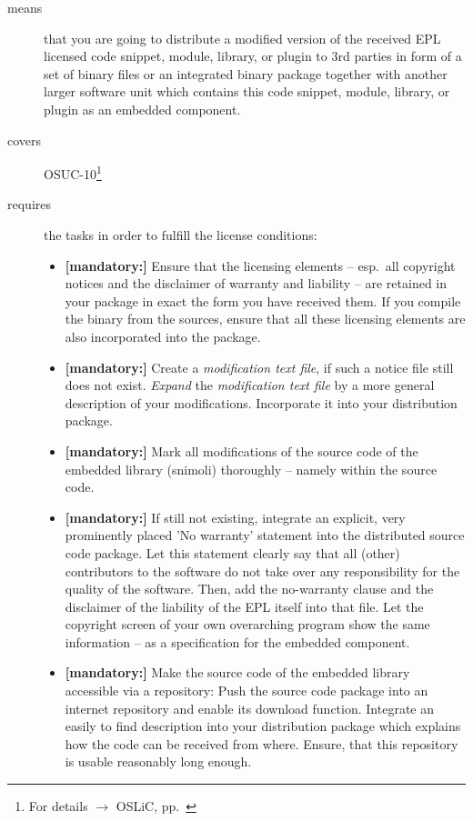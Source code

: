 \begin{description}
\item[means] that you are going to distribute a modified version of the received
EPL licensed code snippet, module, library, or plugin to 3rd parties in form
of a set of binary files or an integrated binary package together with another
larger software unit which contains this code snippet, module, library, or
plugin as an embedded component.
\item[covers] OSUC-10\footnote{For details $\rightarrow$ OSLiC, pp.\ \pageref{OSUC-10-DEF}}
\item[requires] the tasks in order to fulfill the license conditions:
\begin{itemize}

  \item \textbf{[mandatory:]} Ensure that the licensing elements -- esp.\ all
  copyright notices and the disclaimer of warranty and liability -- are retained
  in your package in exact the form you have received them. If you compile the
  binary from the sources, ensure that all these licensing elements are also
  incorporated into the package.
  
  \item \textbf{[mandatory:]} Create a \emph{modification text file}, if such a
  notice file still does not exist. \emph{Expand} the \emph{modification text
  file} by a more general description of your modifications. Incorporate it into
  your distribution package.

  \item \textbf{[mandatory:]} Mark all modifications of the source code of the
  embedded library (snimoli) thoroughly -- namely within the source code.

  \item \textbf{[mandatory:]} If still not existing, integrate an explicit, very
  prominently placed 'No warranty' statement into the distributed source code
  package. Let this statement clearly say that all (other) contributors to the
  software do not take over any responsibility for the quality of the software.
  Then, add the no-warranty clause and the disclaimer of the liability of the
  EPL itself into that file. Let the copyright screen of your own overarching
  program show the same information  -- as a specification for the embedded
  component.
  
  \item \textbf{[mandatory:]} Make the source code of the embedded library
  accessible via a repository: Push the source code package into an internet
  repository and enable its download function. Integrate an easily to find
  description into your distribution package which explains how the code can be
  received from where. Ensure, that this repository is usable reasonably long
  enough.
  

\end{itemize}
\end{description}
